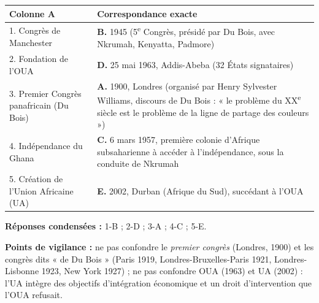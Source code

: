 \documentclass[11pt]{article}
\begin{document}
\begin{corrige}
\begin{center}
\begin{tabularx}{\linewidth}{|X|X|}\hline
\textbf{Colonne A} & \textbf{Correspondance exacte} \\ \hline
1. Congrès de Manchester & \textbf{B.} 1945 (5\textsuperscript{e} Congrès, présidé par Du Bois, avec Nkrumah, Kenyatta, Padmore) \\ \hline
2. Fondation de l'OUA & \textbf{D.} 25 mai 1963, Addis-Abeba (32 États signataires) \\ \hline
3. Premier Congrès panafricain (Du Bois) & \textbf{A.} 1900, Londres (organisé par Henry Sylvester Williams, discours de Du Bois : « le problème du XX\textsuperscript{e} siècle est le problème de la ligne de partage des couleurs ») \\ \hline
4. Indépendance du Ghana & \textbf{C.} 6 mars 1957, première colonie d'Afrique subsaharienne à accéder à l'indépendance, sous la conduite de Nkrumah \\ \hline
5. Création de l'Union Africaine (UA) & \textbf{E.} 2002, Durban (Afrique du Sud), succédant à l'OUA \\ \hline
\end{tabularx}
\end{center}

\textbf{Réponses condensées :} 1-B ; 2-D ; 3-A ; 4-C ; 5-E.

\textbf{Points de vigilance :} ne pas confondre le \emph{premier congrès} (Londres, 1900) et les congrès dits « de Du Bois » (Paris 1919, Londres-Bruxelles-Paris 1921, Londres-Lisbonne 1923, New York 1927) ; ne pas confondre OUA (1963) et UA (2002) : l'UA intègre des objectifs d'intégration économique et un droit d'intervention que l'OUA refusait.
\end{corrige}
\end{document}
